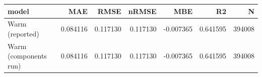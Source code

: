 \begin{tabular}{lrrrrrr}
\toprule
model & MAE & RMSE & nRMSE & MBE & R2 & N \\
\midrule
Warm (reported) & 0.084116 & 0.117130 & 0.117130 & -0.007365 & 0.641595 & 394008 \\
Warm (components run) & 0.084116 & 0.117130 & 0.117130 & -0.007365 & 0.641595 & 394008 \\
\bottomrule
\end{tabular}
